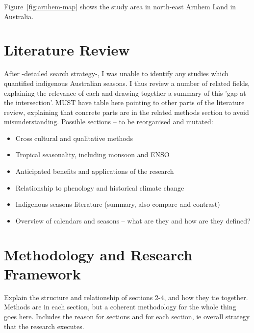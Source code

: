 Figure~\ref{fig:arnhem-map} shows the study area in north-east Arnhem Land in Australia.



\section{Literature Review}
\label{sec:lit-review}

After -detailed search strategy-, I was unable to identify any studies which quantified indigenous Australian seasons.
I thus review a number of related fields, explaining the relevance of each and drawing together a summary of this 'gap at the intersection'.
MUST have table here pointing to other parts of the literature review, explaining that concrete parts are in the related methods section to avoid misunderstanding. 
Possible sections – to be reorganised and mutated:

\begin{itemize}
\item Cross cultural and qualitative methods
\item Tropical seasonality, including monsoon and ENSO
\item Anticipated benefits and applications of the research
\item Relationship to phenology and historical climate change
\item Indigenous seasons literature (summary, also compare and contrast)
\item Overview of calendars and seasons – what are they and how are they defined?
\end{itemize}

\section{Methodology and Research Framework}
Explain the structure and relationship of sections 2-4, and how they tie together.
Methods are in each section, but a coherent methodology for the whole thing goes here.
Includes the reason for sections and for each section, ie overall strategy that the research executes.




